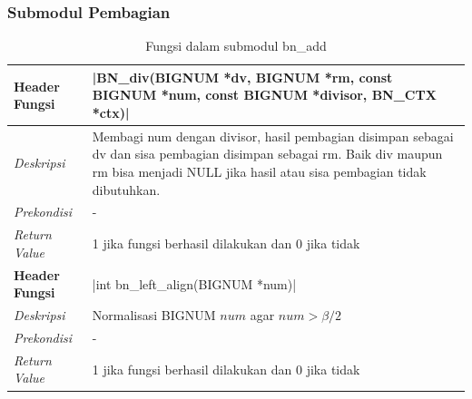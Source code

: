 \subsubsection{Submodul Pembagian}
\begin{table}[h]
  \caption{Fungsi dalam submodul bn\_add}
  \begin{tabular}{R{2.5cm}L{10.5cm}}
\toprule
\textbf{Header Fungsi} & |BN_div(BIGNUM *dv, BIGNUM *rm, const BIGNUM *num, const BIGNUM *divisor, BN_CTX *ctx)|    \\ \midrule
\textit{Deskripsi}     &  Membagi num dengan divisor, hasil pembagian disimpan sebagai dv dan sisa pembagian disimpan sebagai rm. Baik div maupun rm bisa menjadi NULL jika hasil atau sisa pembagian tidak dibutuhkan. \\
\textit{Prekondisi}    &  -\\
\textit{Return Value}  &1 jika fungsi berhasil dilakukan dan 0 jika tidak
 \\ \bottomrule
\textbf{Header Fungsi} & |int bn_left_align(BIGNUM *num)|    \\ \midrule
\textit{Deskripsi}     &  Normalisasi BIGNUM $num$ agar $num > \beta/2$\\
\textit{Prekondisi}    & - \\
\textit{Return Value}  & 1 jika fungsi berhasil dilakukan dan 0 jika tidak
 \\ \bottomrule
\end{tabular}

\end{table}

